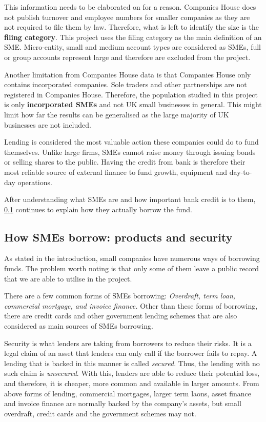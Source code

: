 \documentclass[ %
                    author={Natchalin Iwsakul \\ Inkaphol Siriwongwattana \\ Tanaphan Kummaraphat \\ Patorn Srisupap},
                supervisor={Fernando Moreno-Pino},
                    degree={MSc},
                     title={Propensity Modelling for SME Commercial Lending Using Open Public Data},
                  subtitle={Companies House filings and GDELT media coverage as predictors of first-time borrowing},
                      type={},
                      year={2026}]{dissertation}
\begin{document}
This information needs to be elaborated on for a reason. Companies House does not publish turnover and employee numbers for smaller companies as they are not required to file them by law. Therefore, what is left to identify the size is the \textbf{filing category}. This project uses the filing category as the main definition of an SME. Micro-entity, small and medium account types are considered as SMEs, full or group accounts represent large and therefore are excluded from the project.

Another limitation from Companies House data is that Companies House only contains incorporated companies. Sole traders and other partnerships are not registered in Companies House. Therefore, the population studied in this project is only \textbf{incorporated SMEs} and not UK small businesses in general. This might limit how far the results can be generalised as the large majority of UK businesses are not included.

Lending is considered the most valuable action these companies could do to fund themselves. Unlike large firms, SMEs cannot raise money through issuing bonds or selling shares to the public. Having the credit from bank is therefore their most reliable source of external finance to fund growth, equipment and day-to-day operations.

After understanding what SMEs are and how important bank credit is to them, \ref{sec:borrowing} continues to explain how they actually borrow the fund.


\subsection{How SMEs borrow: products and security}
\label{sec:borrowing}

As stated in the introduction, small companies have numerous ways of borrowing funds. The problem worth noting is that only some of them leave a public record that we are able to utilise in the project.

There are a few common forms of SMEs borrowing: \textit{Overdraft, term loan, commercial mortgage, and invoice finance.} Other than these forms of borrowing, there are credit cards and other government lending schemes that are also considered as main sources of SMEs borrowing.

Security is what lenders are taking from borrowers to reduce their risks. It is a legal claim of an asset that lenders can only call if the borrower fails to repay. A lending that is backed in this manner is called \textit{secured}. Thus, the lending with no such claim is \textit{unsecured}. With this, lenders are able to reduce their potential loss, and therefore, it is cheaper, more common and available in larger amounts. From above forms of lending, commercial mortgages, larger term laons, asset finance and invoice finance are normally backed by the company's assets, but small overdraft, credit cards and the government schemes may not.
\end{document}
